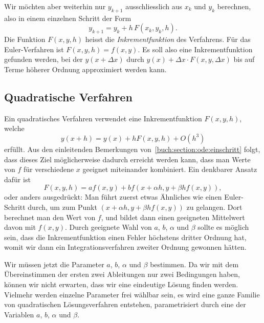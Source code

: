 Wir möchten aber weiterhin nur $y_{k+1}$ ausschliesslich aus $x_k$ und $y_k$
berechnen, also in einem einzelnen Schritt der Form
\[
y_{k+1}=y_k + h\, F(x_k, y_k, h).
\]
Die Funktion $F(x,y,h)$ heisst die {\em Inkrementfunktion}
%
des Verfahrens.
Für das Euler-Verfahren ist $F(x,y,h)=f(x,y)$.
Es soll also eine Inkrementfunktion gefunden werden, bei der $y(x+\Delta x)$
durch $y(x) + \Delta x\cdot F(x,y,\Delta x)$ bis auf Terme höherer
Ordnung approximiert werden kann.

\subsection{Quadratische Verfahren}
%
Ein quadratisches Verfahren verwendet eine Inkrementfunktion $F(x,y,h)$,
welche
\[
y(x+h)=y(x)+hF(x,y,h)+O(h^3)
\]
erfüllt.
Aus den einleitenden Bemerkungen von~\ref{buch:section:ode:einschritt}
folgt, dass dieses Ziel möglicherweise dadurch erreicht werden kann,
dass man Werte von $f$ für verschiedene $x$ geeignet miteinander
kombiniert.
Ein denkbarer Ansatz dafür ist
\[
F(x,y,h)=af(x,y) + bf(x+\alpha h, y +\beta hf(x,y)),
\]
oder anders ausgedrückt: Man führt zuerst etwas Ähnliches wie einen
Euler-Schritt durch, um zum Punkt $(x+\alpha h,y+\beta hf(x,y))$ zu
gelangen.
%
Dort berechnet man den Wert von $f$, und bildet dann einen geeigneten
Mittelwert davon  mit $f(x,y)$.
Durch geeignete Wahl von $a$, $b$, $\alpha$ und $\beta$ sollte es möglich
sein, dass die Inkrementfunktion einen Fehler höchstens dritter Ordnung
hat, womit wir dann ein Integrationsverfahren zweiter Ordnung gewonnen
hätten.

Wir müssen jetzt die Parameter $a$, $b$, $\alpha$ und $\beta$ bestimmen.
Da wir mit dem Übereinstimmen der ersten zwei Ableitungen
nur zwei Bedingungen haben, können wir nicht erwarten, dass wir
eine eindeutige Lösung finden werden.
Vielmehr werden einzelne Parameter frei wählbar sein, es wird eine
ganze Familie von quadratischen Lösungsverfahren entstehen, parametrisiert
durch eine der Variablen $a$, $b$, $\alpha$ und $\beta$.

